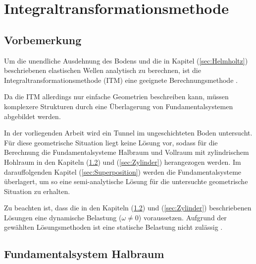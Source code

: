 \chapter{Integraltransformationsmethode}
\label{cha:ITM}


\section{Vorbemerkung}
\label{sec:Vorbemerkung_ITM}

Um die unendliche Ausdehnung des Bodens und die in Kapitel (\ref{sec:Helmholtz}) beschriebenen elastischen Wellen analytisch zu berechnen, ist die Integraltransformationsmethode (ITM) eine geeignete Berechnungsmethode \citep{Mueller2007}.

Da die ITM allerdings nur einfache Geometrien beschreiben kann, müssen komplexere Strukturen durch eine Überlagerung von Fundamentalsystemen abgebildet werden. 

In der vorliegenden Arbeit wird ein Tunnel im ungeschichteten Boden untersucht.
Für diese geometrische Situation liegt keine Lösung vor, sodass für die Berechnung die Fundamentalsysteme Halbraum und Vollraum mit zylindrischem Hohlraum in den Kapiteln (\ref{sec:Halbraum}) und (\ref{sec:Zylinder}) herangezogen werden.
Im darauffolgenden Kapitel (\ref{sec:Superposition}) werden die Fundamentalsysteme überlagert, um so eine semi-analytische Lösung für die untersuchte geometrische Situation zu erhalten.

Zu beachten ist, dass die in den Kapiteln (\ref{sec:Halbraum}) und (\ref{sec:Zylinder}) beschriebenen Lösungen eine dynamische Belastung  (\(\omega \neq 0\)) voraussetzen. Aufgrund der gewählten Lösungsmethoden ist eine statische Belastung nicht zulässig \citep{Fruehe2010}.

\section{Fundamentalsystem Halbraum}
\label{sec:Halbraum}

